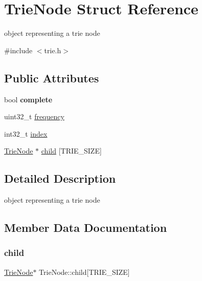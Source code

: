 \hypertarget{structTrieNode}{}\section{Trie\+Node Struct Reference}
\label{structTrieNode}


object representing a trie node  




{\ttfamily \#include $<$trie.\+h$>$}

\subsection*{Public Attributes}
\begin{DoxyCompactItemize}
\item 
\mbox{\label{structTrieNode_a2f05a51dba918a303722ba40b3e951f3}} 
bool {\bfseries complete}
\item 
uint32\+\_\+t \mbox{\hyperlink{structTrieNode_ac92c55f950af2435aa4d2db8eac59fee}{frequency}}
\item 
int32\+\_\+t \mbox{\hyperlink{structTrieNode_a565173828132dce7a69e1e94cf86dd2d}{index}}
\item 
\mbox{\hyperlink{structTrieNode}{Trie\+Node}} $\ast$ \mbox{\hyperlink{structTrieNode_a8f77622a19262ce4dc6b9d2b7505f2fd}{child}} \mbox{[}T\+R\+I\+E\+\_\+\+S\+I\+ZE\mbox{]}
\end{DoxyCompactItemize}


\subsection{Detailed Description}
object representing a trie node 

\subsection{Member Data Documentation}
\mbox{\label{structTrieNode_a8f77622a19262ce4dc6b9d2b7505f2fd}} 
\subsubsection{\texorpdfstring{child}{child}}
{\footnotesize\ttfamily \mbox{\hyperlink{structTrieNode}{Trie\+Node}}$\ast$ Trie\+Node\+::child\mbox{[}T\+R\+I\+E\+\_\+\+S\+I\+ZE\mbox{]}}

